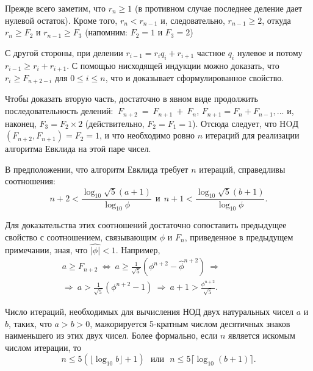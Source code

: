 \documentclass{mai_book}
\begin{document}
\begin{myproof}
Прежде всего заметим, что $r_n \geqslant 1$ (в противном случае последнее 
деление дает нулевой остаток). Кроме того, $r_n < r_{n-1}$ и,  
следовательно, $r_{n-1} \geqslant 2$, откуда $r_n \geqslant F_2$ и $r_{n-1} \geqslant F_3$ (напомним: $F_2 = 1$ и 
$F_3 = 2$)

\noindent С другой стороны, при делении $r_{i-1} = r_i q_i + r_{i + 1}$  частное $q_i$ нулевое 
и потому $r_{i-1} \geqslant r_i + r_{i+1}$. С помощью нисходящей индукции можно 
доказать, что $r_i \geqslant F_{n+2-i}$ для $0 \leqslant i \leqslant n$, что и доказывает  
сформулированное свойство.
 
\noindent Чтобы доказать вторую часть, достаточно в явном виде  
продолжить последовательность делений: $\: F_{n+2}\: = \: F_{n+1}\: + \: F_n$, 
$F_{n+1} = F_n + F_{n-1}, ...$ и, наконец, $F_3 = F_2 \times 2$ (действительно, 
$F_2 = F_1 = 1$). Отсюда следует, что HOД$(F_{n+2}, F_{n+1}) = F_2 = 1$, и 
что необходимо ровно $n$ итераций для реализации алгоритма Евклида
 на этой паре чисел.
\end{myproof} 

\begin{property}
\hspace*{15pt}В предположении, что алгоритм Евклида требует $n$ итераций,  
справедливы соотношения: 
\begin{equation*}
n+2 < \frac{\log_{10}{\sqrt{5}(a+1)}}{\log_{10}{\phi}}\:\: \text{и} \:\: n+1 < \frac{\log_{10}{\sqrt{5}(b+1)}}{\log_{10}{\phi}}.
\end{equation*}
\end{property}

\begin{myproof}
Для доказательства этих соотношений достаточно сопоставить 
предыдущее свойство с соотношением, связывающим $\phi$ и $F_n$,  
приведенное в предыдущем примечании, зная, что $\hat{|\phi|} < 1$. Например, 
\begin{eqnarray*}
a \geqslant F_{n+2}\: \Leftrightarrow \: a \geqslant \frac{1}{\sqrt{5}}(\phi^{n+2} - \hat{\phi}^{n+2}) \: \Rightarrow \qquad\qquad \\
\Rightarrow \: a > \frac{1}{\sqrt{5}}(\phi^{n+2} - 1) \: \Rightarrow \: a+1 > \frac{\phi^{n+2}}{\sqrt{5}}.
\end{eqnarray*}
\end{myproof}

\begin{thm}[Ламе]
\hspace*{15pt}Число итераций, необходимых для вычисления $\text{НОД}$ двух  
натуральных чисел $a$ и $b$, таких, что $a > b > 0$, мажорируется 5-кратным числом 
десятичных знаков наименьшего из этих двух чисел. Более формально, 
если $n$ является искомым числом итерации, то
\begin{equation*}
n \leqslant 5(\lfloor \log_{10}{b} \rfloor + 1)\:\:\: \textit{или}\:\:\: n \leqslant 5 \lceil \log_{10}{(b+1)}\rceil.
\end{equation*}
\end{thm}
\end{document}
